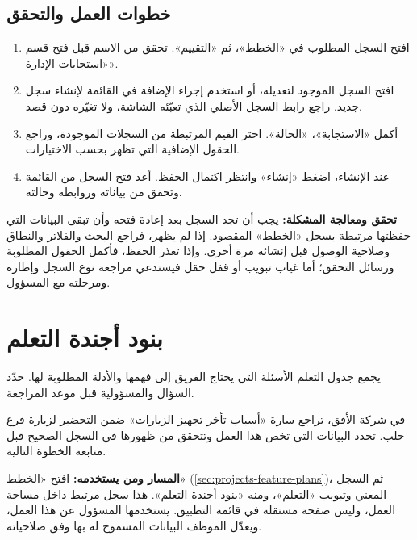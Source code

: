 \subsection{خطوات العمل والتحقق}
\begin{enumerate}
\item افتح السجل المطلوب في «الخطط»، ثم «التقييم». تحقق من الاسم قبل فتح قسم «استجابات الإدارة».
\item افتح السجل الموجود لتعديله، أو استخدم إجراء الإضافة في القائمة لإنشاء سجل جديد. راجع رابط السجل الأصلي الذي تعبّئه الشاشة، ولا تغيّره دون قصد.
\item أكمل «الاستجابة»، «الحالة». اختر القيم المرتبطة من السجلات الموجودة، وراجع الحقول الإضافية التي تظهر بحسب الاختيارات.
\item عند الإنشاء، اضغط «إنشاء» وانتظر اكتمال الحفظ. أعد فتح السجل من القائمة وتحقق من بياناته وروابطه وحالته.
\end{enumerate}

\textbf{تحقق ومعالجة المشكلة:} يجب أن تجد السجل بعد إعادة فتحه وأن تبقى البيانات التي حفظتها مرتبطة بسجل «الخطط» المقصود. إذا لم يظهر، فراجع البحث والفلاتر والنطاق وصلاحية الوصول قبل إنشائه مرة أخرى. وإذا تعذر الحفظ، فأكمل الحقول المطلوبة ورسائل التحقق؛ أما غياب تبويب أو قفل حقل فيستدعي مراجعة نوع السجل وإطاره ومرحلته مع المسؤول.

\clearpage
\section{بنود أجندة التعلم}
\label{sec:projects-feature-planning-learning-agenda-items}

يجمع جدول التعلم الأسئلة التي يحتاج الفريق إلى فهمها والأدلة المطلوبة لها. حدّد السؤال والمسؤولية قبل موعد المراجعة.

\begin{rcnote}
في شركة الأفق، تراجع سارة «أسباب تأخر تجهيز الزيارات» ضمن التحضير لزيارة فرع حلب. تحدد البيانات التي تخص هذا العمل وتتحقق من ظهورها في السجل الصحيح قبل متابعة الخطوة التالية.
\end{rcnote}

\textbf{المسار ومن يستخدمه:} افتح «الخطط» (\ref{sec:projects-feature-plans})، ثم السجل المعني وتبويب «التعلم»، ومنه «بنود أجندة التعلم». هذا سجل مرتبط داخل مساحة العمل، وليس صفحة مستقلة في قائمة التطبيق. يستخدمها المسؤول عن هذا العمل، ويعدّل الموظف البيانات المسموح له بها وفق صلاحياته.

